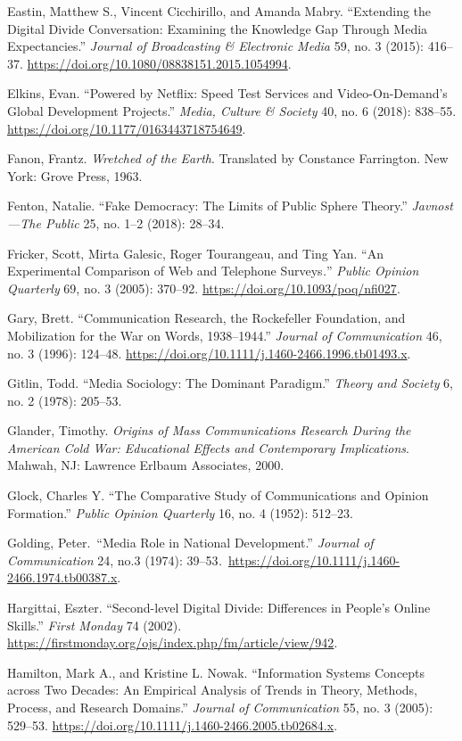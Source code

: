 \documentclass{tufte-handout}
\begin{document}
\begin{hangparas}{.25in}{1}
Eastin, Matthew S., Vincent Cicchirillo, and Amanda Mabry. ``Extending
the Digital Divide Conversation: Examining the Knowledge Gap Through
Media Expectancies.'' \emph{Journal of Broadcasting \& Electronic Media}
59, no. 3 (2015): 416--37.
\url{https://doi.org/10.1080/08838151.2015.1054994}.

Elkins, Evan. ``Powered by Netflix: Speed Test Services and
Video-On-Demand's Global Development Projects.'' \emph{Media, Culture \&
Society} 40, no. 6 (2018): 838--55.
\url{https://doi.org/10.1177/0163443718754649}.

Fanon, Frantz. \emph{Wretched of the Earth}. Translated by Constance
Farrington. New York: Grove Press, 1963.

Fenton, Natalie. ``Fake Democracy: The Limits of Public Sphere Theory.''
\emph{Javnost---The Public} 25, no. 1--2 (2018): 28--34.

Fricker, Scott, Mirta Galesic, Roger Tourangeau, and Ting Yan. ``An
Experimental Comparison of Web and Telephone Surveys\emph{.}''
\emph{Public Opinion Quarterly} 69, no. 3 (2005): 370--92.
\url{https://doi.org/10.1093/poq/nfi027}.

Gary, Brett. ``Communication Research, the Rockefeller Foundation, and
Mobilization for the War on Words, 1938--1944.'' \emph{Journal of
Communication} 46, no. 3 (1996): 124--48.
\url{https://doi.org/10.1111/j.1460-2466.1996.tb01493.x}.

Gitlin, Todd. ``Media Sociology: The Dominant Paradigm.'' \emph{Theory
and Society} 6, no. 2 (1978): 205--53.

Glander, Timothy. \emph{Origins of Mass Communications Research During
the American Cold War: Educational Effects and Contemporary
Implications}. Mahwah, NJ: Lawrence Erlbaum Associates, 2000.

Glock, Charles Y. ``The Comparative Study of Communications and Opinion
Formation.'' \emph{Public Opinion Quarterly} 16, no. 4 (1952): 512--23.

Golding, Peter.~``Media Role in National Development.'' \emph{Journal of
Communication} 24, no.3 (1974):
39--53\emph{.}~\url{https://doi.org/10.1111/j.1460-2466.1974.tb00387.x}.

Hargittai, Eszter. ``Second-level Digital Divide: Differences in
People's Online Skills.'' \emph{First Monday} 74 (2002).
\url{https://firstmonday.org/ojs/index.php/fm/article/view/942}.

Hamilton, Mark A., and Kristine L. Nowak. ``Information Systems Concepts
across Two Decades: An Empirical Analysis of Trends in Theory, Methods,
Process, and Research Domains.'' \emph{Journal of Communication} 55, no.
3 (2005): 529--53.
\url{https://doi.org/10.1111/j.1460-2466.2005.tb02684.x}.


\end{hangparas}
\end{document}
